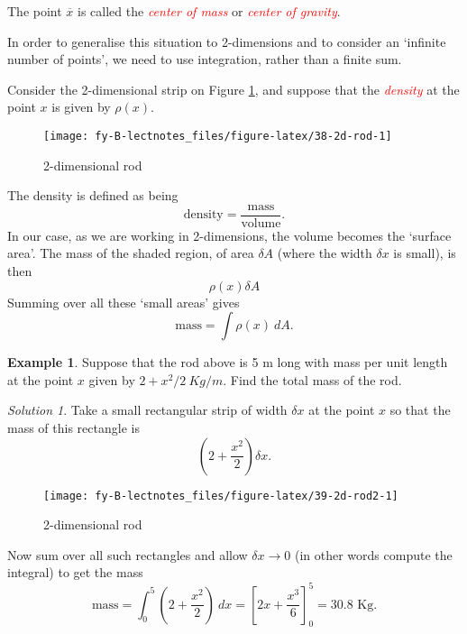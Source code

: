 \documentclass[
  11pt,
  oneside]{book}
\newcommand{\slide}{}
\theoremstyle{definition}
\theoremstyle{definition}
\newtheorem{example}{Example}[chapter]
\theoremstyle{definition}
\theoremstyle{definition}
\theoremstyle{remark}
\newtheorem*{solution}{Solution}
\begin{document}
The point \(\overline x\) is called the \textcolor{red}{\em center of mass} or \textcolor{red}{\em center of gravity}.
\slide

In order to generalise this situation to 2-dimensions and to consider an `infinite number of points', we need to use integration, rather than a finite sum.

Consider the 2-dimensional strip on Figure \ref{fig:38-2d-rod}, and suppose that the \textcolor{red}{\em density} at the point \(x\) is given by \(\rho(x)\).

\begin{figure}

{\centering \texttt{[image: fy-B-lectnotes\_files/figure-latex/38-2d-rod-1]} 

}

\caption{2-dimensional rod}\label{fig:38-2d-rod}
\end{figure}
\slide

The density is defined as being
\[
\text{density} = \frac{\text{mass}}{\text{volume}}.
\]
In our case, as we are working in 2-dimensions, the volume becomes the `surface area'. The mass of the shaded region, of area \(\delta A\) (where the width \(\delta x\) is small), is then
\[
\rho(x)\delta A
\]
Summing over all these `small areas' gives
\[
\text{mass} = \int\rho(x)\ dA.
\]
\slide

\begin{example}
Suppose that the rod above is 5 m long with mass per unit length at the point \(x\) given by \(2+x^2/2\ Kg/m\). Find the total mass of the rod.
\end{example}

\begin{solution}
\leavevmode

Take a small rectangular strip of width \(\delta x\) at the point \(x\) so that the mass of this rectangle is
\[
\left(2+\frac{x^2}2\right)\delta x.
\]

\begin{figure}

{\centering \texttt{[image: fy-B-lectnotes\_files/figure-latex/39-2d-rod2-1]} 

}

\caption{2-dimensional rod}\label{fig:39-2d-rod2}
\end{figure}

Now sum over all such rectangles and allow \(\delta x \to 0\) (in other words compute the integral) to get the mass
\[
\text{mass} = \int_0^5\left(2+\frac{x^2}{2}\right)\ dx = \left[2x+\frac{x^3}{6}\right]_0^5 = 30.8\text{ Kg}.
\]

\end{solution}
\end{document}
